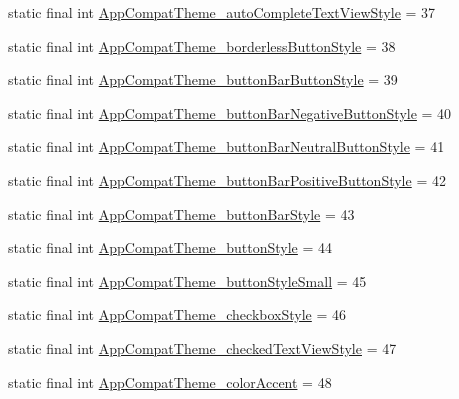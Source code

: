\begin{DoxyCompactItemize}
\item 
static final int \mbox{\hyperlink{classcom_1_1synnapps_1_1carouselview_1_1_r_1_1styleable_a7247d16f9b9fe14e87bd74da59ca7956}{App\+Compat\+Theme\+\_\+auto\+Complete\+Text\+View\+Style}} = 37
\item 
static final int \mbox{\hyperlink{classcom_1_1synnapps_1_1carouselview_1_1_r_1_1styleable_af32f73ebacb77668f02c0ad966bbb3a1}{App\+Compat\+Theme\+\_\+borderless\+Button\+Style}} = 38
\item 
static final int \mbox{\hyperlink{classcom_1_1synnapps_1_1carouselview_1_1_r_1_1styleable_a499a12cd5672001baf68a800cc351ca4}{App\+Compat\+Theme\+\_\+button\+Bar\+Button\+Style}} = 39
\item 
static final int \mbox{\hyperlink{classcom_1_1synnapps_1_1carouselview_1_1_r_1_1styleable_af77107f4a7b4617d53b63b011a74792f}{App\+Compat\+Theme\+\_\+button\+Bar\+Negative\+Button\+Style}} = 40
\item 
static final int \mbox{\hyperlink{classcom_1_1synnapps_1_1carouselview_1_1_r_1_1styleable_ae77331bbb27f4ce0b93dbf7cc887a9c4}{App\+Compat\+Theme\+\_\+button\+Bar\+Neutral\+Button\+Style}} = 41
\item 
static final int \mbox{\hyperlink{classcom_1_1synnapps_1_1carouselview_1_1_r_1_1styleable_a69e53b40d32be867db7103ae27891e41}{App\+Compat\+Theme\+\_\+button\+Bar\+Positive\+Button\+Style}} = 42
\item 
static final int \mbox{\hyperlink{classcom_1_1synnapps_1_1carouselview_1_1_r_1_1styleable_a14f914039a459cf510b6aac537e21e7b}{App\+Compat\+Theme\+\_\+button\+Bar\+Style}} = 43
\item 
static final int \mbox{\hyperlink{classcom_1_1synnapps_1_1carouselview_1_1_r_1_1styleable_a116647fb74a26ab9193951196adbaf4d}{App\+Compat\+Theme\+\_\+button\+Style}} = 44
\item 
static final int \mbox{\hyperlink{classcom_1_1synnapps_1_1carouselview_1_1_r_1_1styleable_aeff641408d564c1a1c7fcac011c31b2b}{App\+Compat\+Theme\+\_\+button\+Style\+Small}} = 45
\item 
static final int \mbox{\hyperlink{classcom_1_1synnapps_1_1carouselview_1_1_r_1_1styleable_a8c7b17d2f6cbbf3b4a3ef29aa1f2f25f}{App\+Compat\+Theme\+\_\+checkbox\+Style}} = 46
\item 
static final int \mbox{\hyperlink{classcom_1_1synnapps_1_1carouselview_1_1_r_1_1styleable_a91b72f3c8a9a2d6f3d9c488764fb2351}{App\+Compat\+Theme\+\_\+checked\+Text\+View\+Style}} = 47
\item 
static final int \mbox{\hyperlink{classcom_1_1synnapps_1_1carouselview_1_1_r_1_1styleable_a084248d68491b2ff33289130439df159}{App\+Compat\+Theme\+\_\+color\+Accent}} = 48

\end{DoxyCompactItemize}
